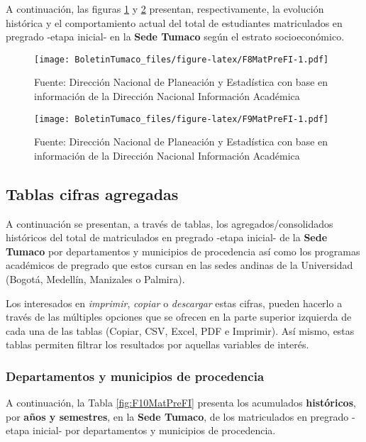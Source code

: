 \documentclass[
]{book}
\begin{document}
A continuación, las figuras \ref{fig:F8MatPreFI} y \ref{fig:F9MatPreFI} presentan, respectivamente, la evolución histórica y el comportamiento actual del total de estudiantes matriculados en pregrado -etapa inicial- en la \textbf{Sede Tumaco} según el estrato socioeconómico.

\begin{figure}
\centering
\texttt{[image: BoletinTumaco\_files/figure-latex/F8MatPreFI-1.pdf]}
\caption{\label{fig:F8MatPreFI}Fuente: Dirección Nacional de Planeación y Estadística con base en información de la Dirección Nacional Información Académica}
\end{figure}

\begin{figure}
\centering
\texttt{[image: BoletinTumaco\_files/figure-latex/F9MatPreFI-1.pdf]}
\caption{\label{fig:F9MatPreFI}Fuente: Dirección Nacional de Planeación y Estadística con base en información de la Dirección Nacional Información Académica}
\end{figure}

\hypertarget{tablas-cifras-agregadas-3}{%
\subsection{Tablas cifras agregadas}\label{tablas-cifras-agregadas-3}}

A continuación se presentan, a través de tablas, los agregados/consolidados históricos del total de matriculados en pregrado -etapa inicial- de la \textbf{Sede Tumaco} por departamentos y municipios de procedencia así como los programas académicos de pregrado que estos cursan en las sedes andinas de la Universidad (Bogotá, Medellín, Manizales o Palmira).

Los interesados en \emph{imprimir}, \emph{copiar} o \emph{descargar} estas cifras, pueden hacerlo a través de las múltiples opciones que se ofrecen en la parte superior izquierda de cada una de las tablas (Copiar, CSV, Excel, PDF e Imprimir). Así mismo, estas tablas permiten filtrar los resultados por aquellas variables de interés.

\hypertarget{departamentos-y-municipios-de-procedencia-2}{%
\subsubsection{Departamentos y municipios de procedencia}\label{departamentos-y-municipios-de-procedencia-2}}

A continuación, la Tabla \ref{fig:F10MatPreFI} presenta los acumulados \textbf{históricos}, por \textbf{años y semestres}, en la \textbf{Sede Tumaco}, de los matriculados en pregrado -etapa inicial- por departamentos y municipios de procedencia.
\end{document}
